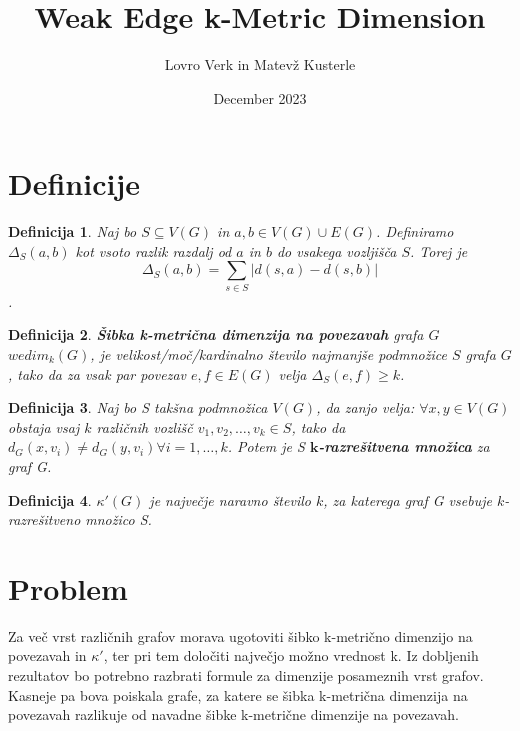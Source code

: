 \documentclass[a4paper,12pt]{article}
\newtheorem{definition}{Definicija}
\begin{document}
\author{Lovro Verk in Matevž Kusterle}
\date{December 2023}
\title{Weak Edge k-Metric Dimension}
\maketitle

\section{Definicije}

    \begin{definition}
       Naj bo $S \subseteq V(G)$ in $a, b \in V(G) \cup E(G)$. Definiramo $\Delta_S (a,b)$ kot vsoto razlik razdalj od $a$ in $b$ do vsakega vozljišča $S$. Torej je $$\Delta_S (a,b) = \sum_{s \in S } |d(s,a) - d(s,b)|$$.
    \end{definition}

    \begin{definition}
        \textbf{Šibka k-metrična dimenzija na povezavah} grafa $G$ $wedim_k(G)$, je velikost/moč/kardinalno število
        najmanjše podmnožice $S$ grafa $G$, tako da za vsak par povezav $e,f \in E(G)$ velja $\Delta_S (e,f) \geq k$.
    \end{definition}

    \begin{definition}
        Naj bo S takšna podmnožica $V(G)$, da zanjo velja: 
        $\forall x,y \in V(G)$ obstaja vsaj $k$ različnih vozlišč $v_1, v_2, \ldots, v_k \in S$, tako da
        $d_G(x,v_i) \neq d_G(y,v_i) \forall i = 1,\ldots,k$. Potem je S \textbf{$\textbf{k}$-razrešitvena množica} za graf G.
    \end{definition}
        
    \begin{definition}
        $\kappa'(G)$ je največje naravno število $k$, za katerega graf G vsebuje $k$-razrešitveno množico S. 
    \end{definition}
\pagebreak

\section{Problem} 
Za več vrst različnih grafov morava ugotoviti šibko k-metrično dimenzijo na povezavah in $\kappa'$, ter pri tem določiti največjo možno vrednost k. Iz dobljenih rezultatov bo potrebno razbrati formule za dimenzije posameznih vrst grafov. Kasneje pa bova poiskala grafe, za katere se šibka k-metrična dimenzija na povezavah razlikuje od navadne šibke k-metrične dimenzije na povezavah.
    
\end{document}
